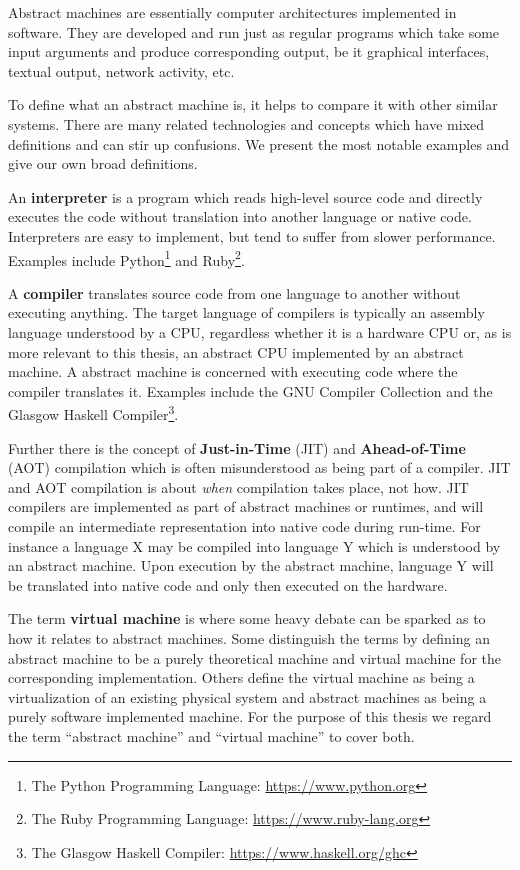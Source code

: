 Abstract machines are essentially computer architectures implemented in
software. They are developed and run just as regular programs which take some
input arguments and produce corresponding output, be it graphical interfaces,
textual output, network activity, etc.

To define what an abstract machine is, it helps to compare it with other similar
systems. There are many related technologies and concepts which have mixed
definitions and can stir up confusions. We present the most notable examples and
give our own broad definitions.

An \textbf{interpreter} is a program which reads high-level source code and
directly executes the code without translation into another language or native
code. Interpreters are easy to implement, but tend to suffer from slower
performance\cite{circuitstoday}. Examples include Python\footnote{The Python
  Programming Language: \url{https://www.python.org}} and Ruby\footnote{The Ruby
  Programming Language: \url{https://www.ruby-lang.org}}.

A \textbf{compiler} translates source code from one language to another without
executing anything. The target language of compilers is typically an assembly
language understood by a CPU, regardless whether it is a hardware CPU or, as is
more relevant to this thesis, an abstract CPU implemented by an abstract
machine. A abstract machine is concerned with executing code where the compiler
translates it. Examples include the GNU Compiler Collection\cite{gnu:gcc} and
the Glasgow Haskell Compiler\footnote{The Glasgow Haskell Compiler:
  \url{https://www.haskell.org/ghc}}.


Further there is the concept of \textbf{Just-in-Time} (JIT) and
\textbf{Ahead-of-Time} (AOT) compilation which is often misunderstood as being
part of a compiler. JIT and AOT compilation is about \textit{when} compilation
takes place, not how. JIT compilers are implemented as part of abstract machines
or runtimes, and will compile an intermediate representation into native code
during run-time. For instance a language X may be compiled into language Y which
is understood by an abstract machine. Upon execution by the abstract machine,
language Y will be translated into native code and only then executed on the
hardware.

The term \textbf{virtual machine} is where some heavy debate can be sparked as
to how it relates to abstract machines. Some distinguish the terms by defining
an abstract machine to be a purely theoretical machine and virtual machine for
the corresponding implementation. Others define the virtual machine as being a
virtualization of an existing physical system and abstract machines as being a
purely software implemented machine. For the purpose of this thesis we regard
the term ``abstract machine'' and ``virtual machine'' to cover both.

